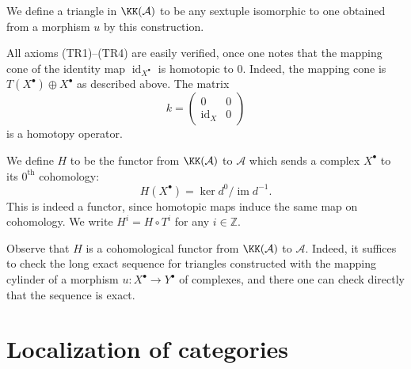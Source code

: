 We define a triangle in $\KK(\mathcal{A})$ to be any sextuple isomorphic to one obtained from a morphism $u$ by this construction.

All axioms (TR1)--(TR4) are easily verified, once one notes that the mapping cone of the identity map $\operatorname{id}_{X^\bullet}$ is homotopic to $0$. Indeed, the mapping cone is
$T(X^\bullet)\oplus X^\bullet$ as described above. The matrix
\[
k = \begin{pmatrix} 0 & 0 \\ \operatorname{id}_X & 0 \end{pmatrix}
\]
is a homotopy operator.

\begin{definition*}
	We define $H$ to be the functor from $\KK(\mathcal{A})$ to $\mathcal{A}$ which sends a complex $X^\bullet$ to its $0^\text{th}$ cohomology:
	\[
	H(X^\bullet) = \ker d^0 \big/ \operatorname{im} d^{-1}.
	\]
	This is indeed a functor, since homotopic maps induce the same map on cohomology. We write $H^i = H\circ T^i$ for any $i\in\mathbb{Z}$.
\end{definition*}

Observe that $H$ is a cohomological functor from $\KK(\mathcal{A})$ to $\mathcal{A}$. Indeed, it suffices to check the long exact sequence for triangles constructed with the mapping cylinder of a morphism $u\colon X^\bullet\to Y^\bullet$ of complexes, and there one can check directly that the sequence is exact.

\section{Localization of categories}\label{sec:1.3}

